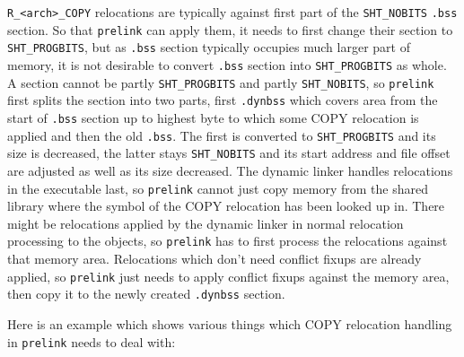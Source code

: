 \documentclass[twoside]{article}
\def\tts#1{\texttt{\small #1}}
\begin{document}
\tts{R\_<arch>\_COPY} relocations are typically against first part of the
\tts{SHT\_NOBITS} \tts{.bss} section.  So that \tts{prelink} can apply them,
it needs to first change their section to \tts{SHT\_PROGBITS}, but as \tts{.bss}
section typically occupies much larger part of memory, it is not desirable
to convert \tts{.bss} section into \tts{SHT\_PROGBITS} as whole.  A section
cannot be partly \tts{SHT\_PROGBITS} and partly \tts{SHT\_NOBITS}, so \tts{prelink}
first splits the section into two parts, first \tts{.dynbss} which covers area
from the start of \tts{.bss} section up to highest byte to which some COPY
relocation is applied and then the old \tts{.bss}.  The first is converted
to \tts{SHT\_PROGBITS} and its size is decreased, the latter stays \tts{SHT\_NOBITS}
and its start address and file offset are adjusted as well as its size decreased.
The dynamic linker handles relocations in the executable last, so \tts{prelink}
cannot just copy memory from the shared library where the symbol of the COPY
relocation has been looked up in.  There might be relocations applied by the
dynamic linker in normal relocation processing to the objects, so \tts{prelink}
has to first process the relocations against that memory area.  Relocations
which don't need conflict fixups are already applied, so \tts{prelink} just
needs to apply conflict fixups against the memory area, then copy it
to the newly created \tts{.dynbss} section.

Here is an example which shows various things which COPY relocation handling
in \tts{prelink} needs to deal with:
\end{document}
